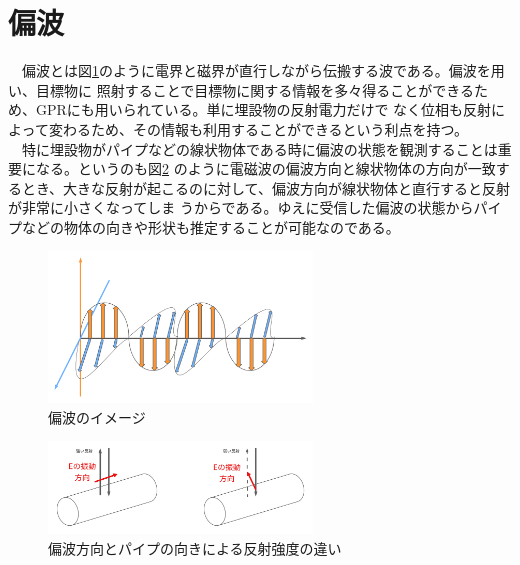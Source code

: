 \documentclass[a4paper,12pt]{jsreport}
\begin{document}
\section{偏波}
　偏波とは図\ref{偏波のイメージ}のように電界と磁界が直行しながら伝搬する波である。偏波を用い、目標物に
照射することで目標物に関する情報を多々得ることができるため、GPRにも用いられている。単に埋設物の反射電力だけで
なく位相も反射によって変わるため、その情報も利用することができるという利点を持つ。
\\　特に埋設物がパイプなどの線状物体である時に偏波の状態を観測することは重要になる。というのも図\ref{偏波方向とパイプの向きによる反射強度の違い}
のように電磁波の偏波方向と線状物体の方向が一致するとき、大きな反射が起こるのに対して、偏波方向が線状物体と直行すると反射が非常に小さくなってしま
うからである。ゆえに受信した偏波の状態からパイプなどの物体の向きや形状も推定することが可能なのである。
\begin{figure}[h]
  \begin{center}
   \includegraphics[width=7cm]{./image/wave_propagation.pdf}
  \caption{偏波のイメージ}\label{偏波のイメージ}
  \end{center}
  \end{figure}

  \begin{figure}[h]
    \begin{center}
     \includegraphics[width=7cm]{./image/polarization.pdf}
    \caption{偏波方向とパイプの向きによる反射強度の違い}\label{偏波方向とパイプの向きによる反射強度の違い}
    \end{center}
    \end{figure}
\end{document}
